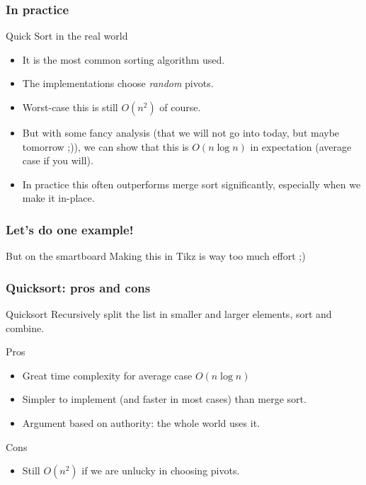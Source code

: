 \begin{frame}
	\frametitle{In practice}
	
		\begin{block}{Quick Sort in the real world}
			\begin{itemize}
				\item It is the most common sorting algorithm used.
				\item The implementations choose \textit{random} pivots.
					\pause
				\item Worst-case this is still $O(n^2)$ of course.
					\pause
				\item But with some fancy analysis (that we will not go into today, but maybe tomorrow ;)), we can show that
					this is $O(n \log n)$ in expectation (average case if you will).
					\pause
				\item In practice this often outperforms merge sort significantly, especially when we make it in-place.
			\end{itemize}
		\end{block}	
\end{frame}

\begin{frame}
	\frametitle{Let's do one example!}
	\begin{block}{But on the smartboard}
		Making this in Tikz is way too much effort ;)
	\end{block}		
\end{frame}

\begin{frame}
	\frametitle{Quicksort: pros and cons}
	\begin{block}{Quicksort}
			Recursively split the list in smaller and larger elements, sort and combine.
		\end{block}	
		\begin{exampleblock}{Pros}
			\begin{itemize}
				\item Great time complexity for average case $O(n\log n)$
				\item Simpler to implement (and faster in most cases) than merge sort.
				\item Argument based on authority: the whole world uses it.
			\end{itemize}
		\end{exampleblock}	
		\begin{alertblock}{Cons}
			\begin{itemize}
				\item Still $O(n^2)$ if we are unlucky in choosing pivots.
			\end{itemize}
		\end{alertblock}	
\end{frame}
